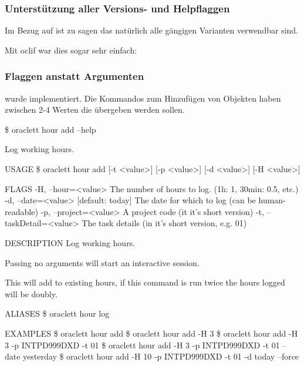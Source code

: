 \documentclass[oneside,bibliography=totocnumbered,BCOR=5mm]{scrbook}
\newenvironment{code}{\captionsetup{type=listing, skip=0pt}}{}
\begin{document}
\subsubsection{Unterstützung aller Versions- und Helpflaggen}

Im Bezug auf  ist zu sagen das natürlich alle
gängigen Varianten verwendbar sind.

Mit oclif war dies sogar sehr einfach:
\begin{code}
  \begin{javascriptcode}
...
"oclif": {
  "additionalHelpFlags": [
    "-h",
    "help"
  ],
  "additionalVersionFlags": [
    "-v",
    "-V",
    "version"
  ],
  ...
  \end{javascriptcode}
  \medskip
\end{code}

\subsubsection{Flaggen anstatt Argumenten}

 wurde implementiert. Die Kommandos zum Hinzufügen
von Objekten haben zwischen 2-4 Werten die übergeben werden sollen.

\begin{code}
  \begin{shellcode}
\$ oraclett hour add --help

Log working hours.

USAGE
  \$ oraclett hour add [-t <value>] [-p <value>] [-d <value>] [-H <value>]

FLAGS
  -H, --hour=<value>        The number of hours to log. (1h: 1, 30min: 0.5, etc.)
  -d, --date=<value>        [default: today] The date for which to log (can be human-readable)
  -p, --project=<value>     A project code (it it's short version)
  -t, --taskDetail=<value>  The task details (in it's short version, e.g. 01)

DESCRIPTION
  Log working hours.

  Passing no arguments will start an interactive session.

  This will add to existing hours, if this command is run twice the hours logged will be doubly.

ALIASES
  \$ oraclett hour log

EXAMPLES
  \$ oraclett hour add
  \$ oraclett hour add -H 3
  \$ oraclett hour add -H 3 -p INTPD999DXD -t 01
  \$ oraclett hour add -H 3 -p INTPD999DXD -t 01 --date yesterday
  \$ oraclett hour add -H 10 -p INTPD999DXD -t 01 -d today --force
  \end{shellcode}
  \medskip
\end{code}
\end{document}
